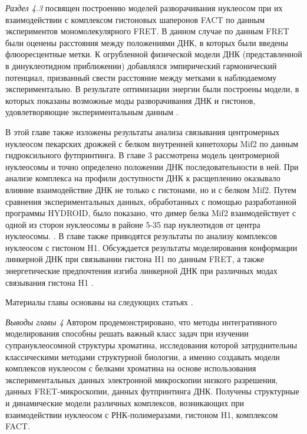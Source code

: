 \textit{Раздел 4.3} посвящен построению моделей разворачивания нуклеосом при их взаимодействии с комплексом гистоновых шаперонов FACT по данным экспериментов мономолекулярного FRET.
В данном случае по данным FRET были оценены расстояния между положениями ДНК, в которых  были введены флюоресцентные метки. К огрубленной физической модели ДНК (представленной в динуклеотидном приближении) добавлялся эмпирический гармонический потенциал, призванный свести расстояние между метками к наблюдаемому экспериментально. В результате оптимизации энергии были построены модели, в которых показаны возможные моды разворачивания ДНК и гистонов, удовлетворяющие экспериментальным данным \cite{valieva_large-scale_2016}.

В этой главе также изложены результаты анализа связывания центромерных нуклеосом пекарских дрожжей с белком внутренней кинетохоры Mif2 по данным гидроксильного футпринтинга. В главе 3 рассмотрена модель центромерной нуклеосомы и точно определено положении ДНК последовательности в ней. При анализе комплекса на профили доступности ДНК к расщеплению оказывало влияние взаимодействие ДНК не только с гистонами, но и с белком Mif2. Путем сравнения экспериментальных данных, обработанных с помощью разработанной программы HYDROID, было показано, что димер белка Mif2 взаимодействует с одной из сторон нуклеосомы в районе 5-35 пар нуклеотидов от центра нуклеосомы.   \cite{xiao_molecular_2017}. В главе также приводятся результаты по анализу комплексов нуклеосом с гистоном H1. 
Обсуждается результаты моделирования конформации линкерной ДНК при связывании гистона H1 по данным FRET, а также энергетические предпочтения изгиба линкерной ДНК при различных модах связывания гистона H1 \cite{gorkovets_joint_2018,bass_effect_2019,armeev_modeling_2016}. 

Материалы главы основаны на следующих статьях \cite{xiao_molecular_2017,gaykalova_structural_2015,valieva_large-scale_2016,gorkovets_joint_2018,bass_effect_2019,armeev_modeling_2016}.



\textit{Выводы главы 4} \newline
Автором продемонстрировано, что методы интегративного моделирования способны решать важный класс задач при изучении супрануклеосомной структуры хроматина, исследования которой затруднительны классическими методами структурной биологии, а именно создавать модели комплексов нуклеосом с белками хроматина на основе использования экспериментальных данных электронной микроскопии низкого разрешения, данных FRET-микроскопии, данных футпринтинга ДНК. Получены структурные и динамические модели различных комплексов, возникающих при взаимодействии нуклеосом с РНК-полимеразами, гистоном H1, комплексом FACT.





